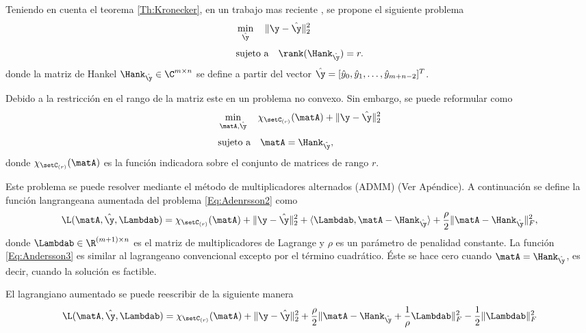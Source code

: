 	Teniendo en cuenta el teorema \eqref{Th:Kronecker}, en un trabajo mas reciente \cite{Andersson2014}, se propone el siguiente problema  
	\begin{equation}
		\begin{aligned} 
			& \min_{\hat{\y}} \quad \|\y - \hat{\y}\|_2^2 \\[0.3em]
			& \text{sujeto a} \quad  \rank(\Hank_{\hat{\y}}) = r.
		\end{aligned}
		\label{Eq:Andersson1}
	\end{equation}
	donde la matriz de Hankel $\Hank_{\hat{\y}}\in\C^{m\times n}$ se define a partir del vector $\hat{\y} = [\hat{y}_0, \hat{y}_1,\ldots, \hat{y}_{m+n-2}]^T$.

	Debido a la restricción en el rango de la matriz este en un problema no convexo. Sin embargo, se puede reformular como	
	\begin{equation}
		\begin{aligned} 
			& \min_{\matA,\hat{\y}} \quad \chi_{\setC_{(r)}}(\matA) + \|\y-\hat{\y}\|_2^2\\[0.3em]
			& \text{sujeto a} \quad  \matA = \Hank_{\hat{\y}},
		\end{aligned}
		\label{Eq:Adenrsson2}			 
	\end{equation}
	donde $\chi_{\setC_{(r)}}(\matA)$ es la función indicadora sobre el conjunto de matrices de rango $r$.

	Este problema se puede resolver mediante el método de multiplicadores alternados (ADMM)\cite{Boyd2011} (Ver Apéndice). A continuación se define la función langrangeana aumentada del problema \eqref{Eq:Adenrsson2} como
	\begin{equation}
		\L(\matA,\hat{\y},\Lambdab) =\chi_{\setC_{(r)}}(\matA) + \|\y-\hat{\y}\|_2^2  + \langle\Lambdab,\matA-\Hank_{\hat{\y}}\rangle + \frac{\rho}{2}\|\matA - \Hank_{\hat{\y}}\|_F^2,
		\label{Eq:Andersson3}
	\end{equation}
	donde $\Lambdab\in\R^{(m+1)\times n}$ es el matriz de multiplicadores de Lagrange y $\rho$ es un parámetro de penalidad constante. La función \eqref{Eq:Andersson3} es similar al lagrangeano convencional excepto por el término cuadrático. Éste se hace cero cuando $\matA = \Hank_{\hat{\y}}$, es decir, cuando la solución es factible. 

	El lagrangiano aumentado se puede reescribir de la siguiente manera
	\begin{equation}
		\L(\matA,\hat{\y},\Lambdab) = \chi_{\setC_{(r)}}(\matA) + \|\y-\hat{\y}\|_2^2 + \frac{\rho}{2}\|\matA-\Hank_{\hat{\y}}+\frac{1}{\rho}\Lambdab\|^2_F -\frac{1}{2}\|\Lambdab\|_F^2
		\label{Eq:Andersson4} 
	\end{equation}

